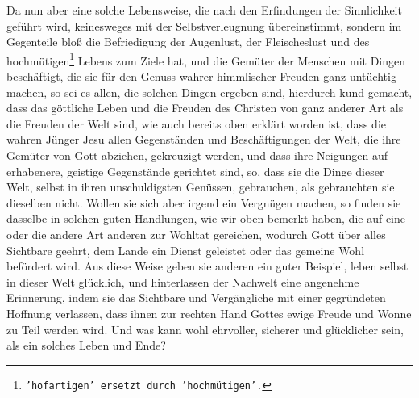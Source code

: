 Da nun aber eine solche Lebensweise, die nach den Erfindungen der Sinnlichkeit
geführt wird, keinesweges mit der Selbstverleugnung übereinstimmt, sondern im
Gegenteile bloß die Befriedigung der Augenlust, der Fleischeslust und des
hochmütigen\footnote{\texttt{'hofartigen' ersetzt durch 'hochmütigen'.}} Lebens
zum
Ziele hat, und die Gemüter der Menschen mit Dingen
beschäftigt, die sie für den Genuss wahrer himmlischer Freuden ganz untüchtig
machen, so sei es allen, die solchen Dingen ergeben sind, hierdurch kund
gemacht, dass
das göttliche Leben und die Freuden des Christen von ganz anderer Art als die
Freuden der Welt sind, wie auch bereits oben erklärt worden ist, dass die wahren
Jünger Jesu allen Gegenständen und Beschäftigungen der Welt, die ihre Gemüter
von Gott abziehen, gekreuzigt werden, und dass
ihre Neigungen
auf erhabenere,
geistige Gegenstände gerichtet sind, so, dass sie die Dinge dieser Welt, selbst
in ihren unschuldigsten Genüssen, gebrauchen, als gebrauchten sie dieselben
nicht. Wollen sie sich aber irgend ein Vergnügen machen, so finden sie dasselbe
in solchen guten Handlungen, wie wir oben bemerkt haben, die auf eine oder die
andere Art anderen zur Wohltat gereichen, wodurch Gott über alles Sichtbare
geehrt, dem Lande ein Dienst geleistet oder das gemeine Wohl befördert wird.
Aus diese Weise geben sie anderen ein guter Beispiel, leben selbst in dieser
Welt
glücklich, und hinterlassen der Nachwelt eine angenehme
Erinnerung, indem sie
das Sichtbare und Vergängliche mit einer gegründeten Hoffnung verlassen, dass
ihnen zur rechten Hand Gottes ewige Freude und Wonne zu Teil werden wird. Und
was kann wohl ehrvoller, sicherer und glücklicher sein, als ein solches Leben
und Ende?


